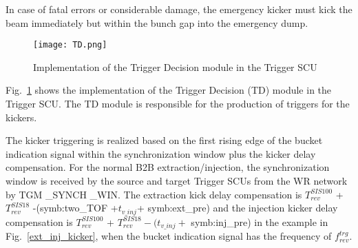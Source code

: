 In case of fatal errors or considerable damage, the emergency kicker must kick the beam immediately but within the bunch gap into the emergency dump.



%
 \begin{figure}[!htb]
   \centering   
   \texttt{[image: TD.png]}
   \caption{Implementation of the Trigger Decision module in the Trigger SCU}
   \label{TD}
\end{figure}
Fig.~\ref{TD} shows the implementation of the Trigger Decision (\gls{TD}) module in the Trigger SCU.  The TD module is responsible for the production of triggers for the kickers. 

The kicker triggering is realized based on the first rising edge of the bucket indication signal within the synchronization window plus the kicker delay compensation. For the normal B2B extraction/injection, the synchronization window is received by the source and target Trigger SCUs from the WR network by TGM \_SYNCH \_WIN. The extraction kick delay compensation is $T_{\mathit{rev}}^{\mathit{SIS100}}$ + $T_{\mathit{rev}}^{\mathit{SIS18}}$ -(\gls{symb:two_TOF} +$ t_{v\_inj}$+ \gls{symb:ext_pre}) and the injection kicker delay compensation is $T_{\mathit{rev}}^{\mathit{SIS100}}$ + $T_{\mathit{rev}}^{\mathit{SIS18}} - (t_{v\_inj}+$ \gls{symb:inj_pre}) in the example in Fig.~\ref{ext_inj_kicker}, when the bucket indication signal has the frequency of $f_{\mathit{rev}}^{\mathit{trg}}$. 

